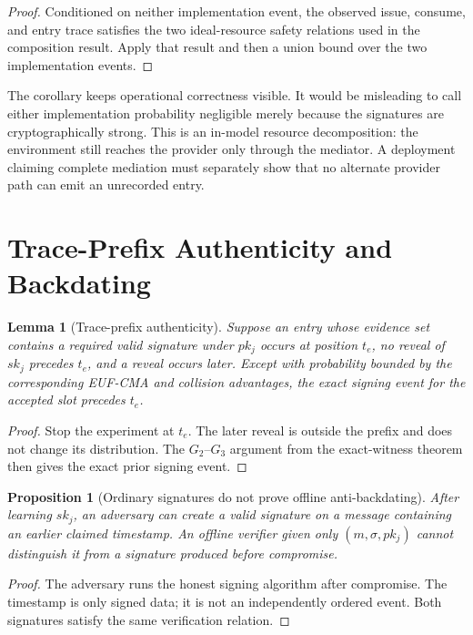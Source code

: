 \documentclass[10pt]{article}
\newtheorem{lemma}{Lemma}
\newtheorem{proposition}{Proposition}
\begin{document}
\begin{proof}
Conditioned on neither implementation event, the observed issue, consume, and
entry trace satisfies the two ideal-resource safety relations used in the
composition result. Apply that result and then a union bound over the two
implementation events.
\end{proof}

The corollary keeps operational correctness visible. It would be misleading to
call either implementation probability negligible merely because the
signatures are cryptographically strong. This is an in-model resource
decomposition: the environment still reaches the provider only through the
mediator. A deployment claiming complete mediation must separately show that no
alternate provider path can emit an unrecorded entry.

\section{Trace-Prefix Authenticity and Backdating}

\begin{lemma}[Trace-prefix authenticity]
Suppose an entry whose evidence set contains a required valid signature under
$pk_j$ occurs at position $t_e$, no
reveal of $sk_j$ precedes $t_e$, and a reveal occurs later. Except with
probability bounded by the corresponding EUF-CMA and collision advantages, the
exact signing event for the accepted slot precedes $t_e$.
\end{lemma}

\begin{proof}
Stop the experiment at $t_e$. The later reveal is outside the prefix and does
not change its distribution. The $G_2$--$G_3$ argument from the exact-witness theorem
then gives the exact prior signing event.
\end{proof}

\begin{proposition}[Ordinary signatures do not prove offline anti-backdating]
After learning $sk_j$, an adversary can create a valid signature on a message
containing an earlier claimed timestamp. An offline verifier given only
$(m,\sigma,pk_j)$ cannot distinguish it from a signature produced before
compromise.
\end{proposition}

\begin{proof}
The adversary runs the honest signing algorithm after compromise. The timestamp
is only signed data; it is not an independently ordered event. Both signatures
satisfy the same verification relation.
\end{proof}
\end{document}
